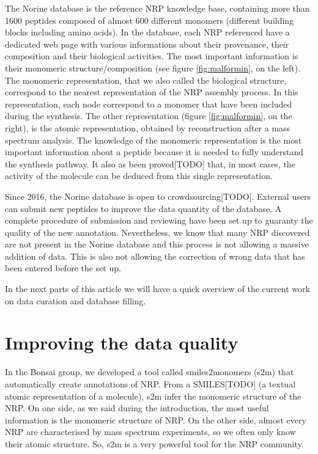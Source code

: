 \documentclass[long, final]{jobim2017}
\begin{document}
The Norine database is the reference NRP knowledge base, containing more than 1600 peptides composed of almost 600 different monomers (different building blocks including amino acids).
In the database, each NRP referenced have a dedicated web page with various informations about their provenance, their composition and their biological activities.
The most important information is their monomeric structure/composition (see figure \ref{fig:malformin}, on the left).
The monomeric representation, that we also called the biological structure, correspond to the nearest representation of the NRP assembly process.
In this representation, each node correspond to a monomer that have been included during the synthesis.
The other representation (figure \ref{fig:malformin}, on the right), is the atomic representation, obtained by reconstruction after a mass spectrum analysis.
The knowledge of the monomeric representation is the most important information about a peptide because it is needed to fully understand the synthesis pathway.
It also as been proved[TODO] that, in most cases, the activity of the molecule can be deduced from this single representation.

Since 2016, the Norine database is open to crowdsourcing[TODO].
External users can submit new peptides to improve the data quantity of the database.
A complete procedure of submission and reviewing have been set up to guaranty the quality of the new annotation.
Nevertheless, we know that many NRP discovered are not present in the Norine database and this process is not allowing a massive addition of data.
This is also not allowing the correction of wrong data that has been entered before the set up.

In the next parts of this article we will have a quick overview of the current work on data curation and database filling.


\section{Improving the data quality}

In the Bonsai group, we developed a tool called smiles2monomers (s2m) that automatically create annotations of NRP.
From a SMILES[TODO] (a textual atomic representation of a molecule), s2m infer the monomeric structure of the NRP.
On one side, as we said during the introduction, the most useful information is the monomeric structure of NRP.
On the other side, almost every NRP are characterised by mass spectrum experiments, so we often only know their atomic structure.
So, s2m is a very powerful tool for the NRP community.
\end{document}
